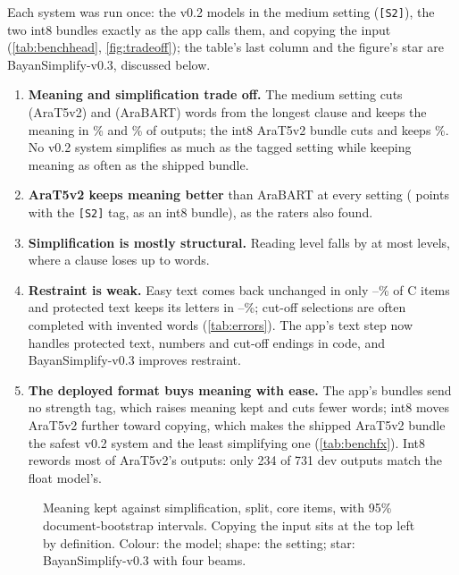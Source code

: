 \documentclass[10pt,a4paper]{article}
\newcommand{\vThree}{BayanSimplify-v0.3}
\begin{document}
\readertable

 Each system was
run once: the v0.2 models in the medium setting (\texttt{[S2]}), the two int8
bundles exactly as the app calls them, and copying the input
(\autoref{tab:benchhead}, \autoref{fig:tradeoff}); the table's last column and the
figure's star are \vThree{}, discussed below.

\benchheadtable

\begin{enumerate}[label=\textbf{F\arabic*}, leftmargin=8mm]
\item \textbf{Meaning and simplification trade off.} The medium setting cuts
      \bvHTfiveClause{} (AraT5v2) and \bvHBartClause{} (AraBART) words from the
      longest clause and keeps the meaning in \bvHTfiveKept\% and \bvHBartKept\%
      of outputs; the int8 AraT5v2 bundle cuts \bvHAppTfiveClause{} and keeps
      \bvHAppTfiveKept\%. No v0.2 system simplifies as much as the tagged setting
      while keeping meaning as often as the shipped bundle.
\item \textbf{AraT5v2 keeps meaning better} than AraBART at every setting
      (\bfxHTfivevsBartKept{} points with the \texttt{[S2]} tag,
      \bfxHAppTfivevsAppBartKept{} as an int8 bundle), as the raters also found.
\item \textbf{Simplification is mostly structural.} Reading level falls by at most
      \bvHmaxLevel{} levels, where a clause loses up to \bvHmaxClause{} words.
\item \textbf{Restraint is weak.} Easy text comes back unchanged in only
      \bvHminC--\bvHmaxC\% of C items and protected text keeps its letters in
      \bvHminF--\bvHmaxF\%; cut-off selections are often completed with invented
      words (\autoref{tab:errors}). The app's text step now handles protected text,
      numbers and cut-off endings in code, and \vThree{} improves restraint.
\item \textbf{The deployed format buys meaning with ease.} The app's bundles send
      no strength tag, which raises meaning kept and cuts fewer words; int8 moves
      AraT5v2 further toward copying, which makes the shipped AraT5v2 bundle the
      safest v0.2 system and the least simplifying one (\autoref{tab:benchfx}).
      Int8 rewords most of AraT5v2's outputs: only 234 of 731 dev outputs match
      the float model's.
\end{enumerate}

\begin{figure}[h]
\centering
\figtradeoff{\tradeoffH}
\caption{Meaning kept against simplification, \benchheadsplit{} split, core items,
with 95\% document-bootstrap intervals. Copying the input sits at the top left by
definition. Colour: the model; shape: the setting; star: \vThree{} with four beams.}
\label{fig:tradeoff}
\end{figure}
\end{document}
